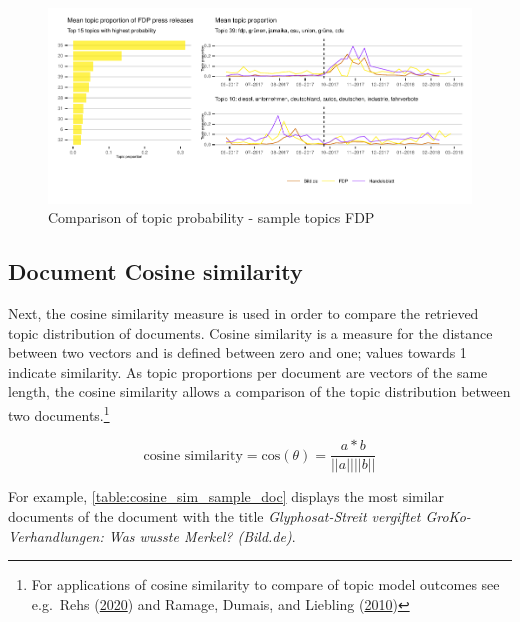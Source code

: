 \documentclass[
]{article}
\begin{document}
\begin{figure}

{\centering \includegraphics[width=1\linewidth]{main_text_files/figure-latex/Top FDP topics-1} 

}

\caption{Comparison of topic probability - sample topics FDP \label{fig:sample_topics_fdp}}\label{fig:Top FDP topics}
\end{figure}

\hypertarget{document-cosine-similarity}{%
\subsection{Document Cosine
similarity}\label{document-cosine-similarity}}

Next, the cosine similarity measure is used in order to compare the
retrieved topic distribution of documents. Cosine similarity is a
measure for the distance between two vectors and is defined between zero
and one; values towards 1 indicate similarity. As topic proportions per
document are vectors of the same length, the cosine similarity allows a
comparison of the topic distribution between two documents.\footnote{For
  applications of cosine similarity to compare of topic model outcomes
  see e.g.~Rehs (\protect\hyperlink{ref-rehs_structural_2020}{2020}) and
  Ramage, Dumais, and Liebling
  (\protect\hyperlink{ref-ramage_characterizing_2010}{2010})}

\[
\text{cosine similarity} = \text{cos}(\theta)=\frac{a*b}{||a|| ||b||}
\]

For example, \autoref{table:cosine_sim_sample_doc} displays the most
similar documents of the document with the title \emph{Glyphosat-Streit
vergiftet GroKo-Verhandlungen: Was wusste Merkel? (Bild.de)}.
\end{document}
